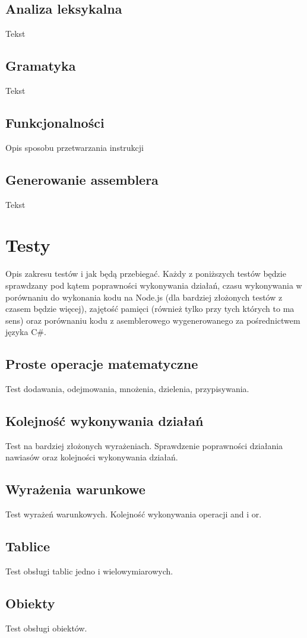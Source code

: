 \documentclass[a4paper]{article}
\begin{document}
\subsection{Analiza leksykalna}
Tekst
\subsection{Gramatyka}
Tekst
\subsection{Funkcjonalności}
Opis sposobu przetwarzania instrukcji
\subsection{Generowanie assemblera}
Tekst

\section{Testy}
Opis zakresu testów i jak będą przebiegać.
Każdy z poniższych testów będzie sprawdzany pod kątem poprawności wykonywania działań, czasu wykonywania w porównaniu do wykonania kodu na Node.js (dla bardziej złożonych testów z czasem będzie więcej), zajętość pamięci (również tylko przy tych których to ma sens) oraz porównaniu kodu z asemblerowego wygenerowanego za pośrednictwem języka C\#.

\subsection{Proste operacje matematyczne}
Test dodawania, odejmowania, mnożenia, dzielenia, przypisywania.
\subsection{Kolejność wykonywania działań}
Test na bardziej złożonych wyrażeniach. Sprawdzenie poprawności działania nawiasów oraz kolejności wykonywania działań.
\subsection{Wyrażenia warunkowe}
Test wyrażeń warunkowych. Kolejność wykonywania operacji and i or.
\subsection{Tablice}
Test obsługi tablic jedno i wielowymiarowych.
\subsection{Obiekty}
Test obsługi obiektów.
\end{document}
